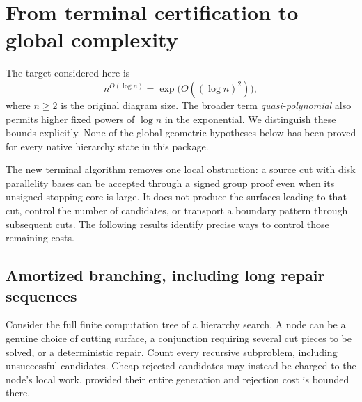 
\section{From terminal certification to global complexity}
\label{sec:global-bridge}

The target considered here is
\[
 n^{O(\log n)}=\exp\bigl(O((\log n)^2)\bigr),
\]
where $n\geq2$ is the original diagram size.  The broader term
\emph{quasi-polynomial} also permits higher fixed powers of $\log n$ in
the exponential.  We distinguish these bounds explicitly.  None of the
global geometric hypotheses below has been proved for every native
hierarchy state in this package.

The new terminal algorithm removes one local obstruction: a source cut
with disk parallelity bases can be accepted through a signed group proof
even when its unsigned stopping core is large.  It does not produce the
surfaces leading to that cut, control the number of candidates, or
transport a boundary pattern through subsequent cuts.  The following
results identify precise ways to control those remaining costs.

\subsection{Amortized branching, including long repair sequences}

Consider the full finite computation tree of a hierarchy search.  A
node can be a genuine choice of cutting surface, a conjunction requiring
several cut pieces to be solved, or a deterministic repair.  Count every
recursive subproblem, including unsuccessful candidates.  Cheap rejected
candidates may instead be charged to the node's local work, provided
their entire generation and rejection cost is bounded there.

